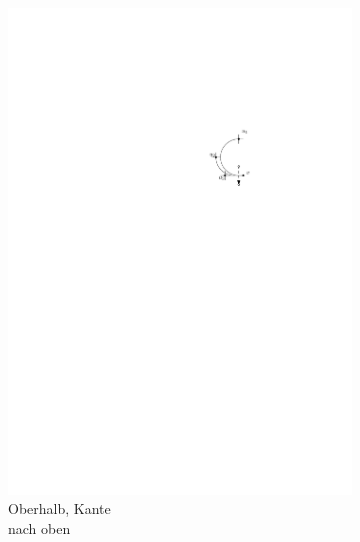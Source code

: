 \documentclass[a4paper]{scrreprt}
\theoremstyle{definition}
\begin{document}
\begin{figure}[h]
\begin{subfigure}[b]{0.2\textwidth}
                \includegraphics[width=\textwidth]{schnitt_finden/top_upwards}
                \caption{Oberhalb, Kante \\ nach oben}
                \label{fig:cutfinding_top_upwards}
        \end{subfigure}
        \quad
        \begin{subfigure}[b]{0.2\textwidth}

\end{subfigure}
\end{figure}
\end{document}
